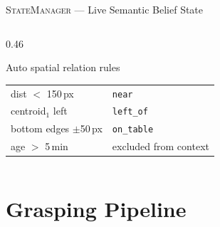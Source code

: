 \documentclass[aspectratio=169, 10pt]{beamer}
\begin{document}
\begin{frame}{\textsc{StateManager} --- Live Semantic Belief State}
\begin{columns}[T]
\begin{column}{0.46\textwidth}
      \vspace{0.35em}
      \begin{exampleblock}{\small Auto spatial relation rules}
        \scriptsize
        \begin{tabular}{ll}
          dist $<$ 150\,px  & \texttt{near}\\
          centroid$_1$ left  & \texttt{left\_of}\\
          bottom edges $\pm$50\,px & \texttt{on\_table}\\
          age $>$ 5\,min & excluded from context\\
        \end{tabular}
      \end{exampleblock}
    \end{column}
  \end{columns}
\end{frame}

\section{Grasping Pipeline}
\end{document}
